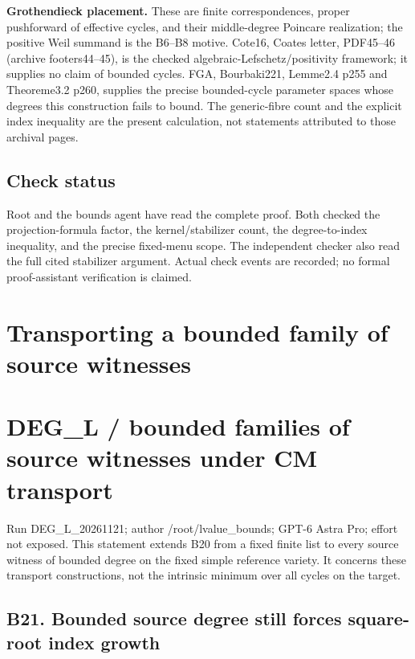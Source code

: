 \documentclass[11pt,a4paper]{article}
\providecommand{\tightlist}{\setlength{\itemsep}{0pt}\setlength{\parskip}{0pt}}
\theoremstyle{definition}
\begin{document}
\textbf{Grothendieck placement.} These are finite correspondences,
proper pushforward of effective cycles, and their middle-degree Poincare
realization; the positive Weil summand is the B6--B8 motive. Cote16,
Coates letter, PDF45--46 (archive footers44--45), is the checked
algebraic-Lefschetz/positivity framework; it supplies no claim of
bounded cycles. FGA, Bourbaki221, Lemme2.4 p255 and Theoreme3.2 p260,
supplies the precise bounded-cycle parameter spaces whose degrees this
construction fails to bound. The generic-fibre count and the explicit
index inequality are the present calculation, not statements attributed
to those archival pages.

\subsection{Check status}\label{check-status}

Root and the bounds agent have read the complete proof. Both checked the
projection-formula factor, the kernel/stabilizer count, the
degree-to-index inequality, and the precise fixed-menu scope. The
independent checker also read the full cited stabilizer argument. Actual
check events are recorded; no formal proof-assistant verification is
claimed.

\section{Transporting a bounded family of source witnesses}

\providecommand{\tightlist}{\setlength{\itemsep}{0pt}\setlength{\parskip}{0pt}}
\section{DEG\_L / bounded families of source witnesses under CM transport}\label{deg_l-bounded-families-of-source-witnesses-under-cm-transport}

Run DEG\_L\_20261121; author /root/lvalue\_bounds; GPT-6 Astra Pro; effort not exposed. This statement extends B20 from a fixed finite list to every source witness of bounded degree on the fixed simple reference variety. It concerns these transport constructions, not the intrinsic minimum over all cycles on the target.

\subsection{B21. Bounded source degree still forces square-root index growth}\label{b21.-bounded-source-degree-still-forces-square-root-index-growth}
\end{document}
